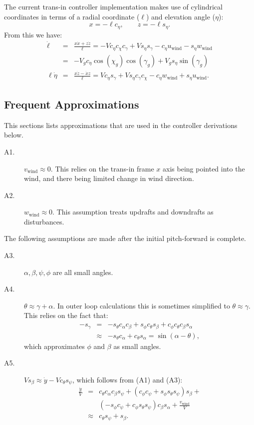 \documentclass{article}
\newcommand{\uwind}{u_{\textrm{wind}}}
\newcommand{\vwind}{v_{\textrm{wind}}}
\newcommand{\wwind}{w_{\textrm{wind}}}
\newcommand{\radius}{\ell}
\newcommand{\dradius}{\dot \radius}
\newcommand{\cchi}{c_\chi}
\newcommand{\cgamma}{c_\gamma}
\newcommand{\ceta}{c_\eta}
\newcommand{\cphi}{c_\phi}
\newcommand{\ctheta}{c_\theta}
\newcommand{\cpsi}{c_\psi}
\newcommand{\calpha}{c_\alpha}
\newcommand{\cbeta}{c_\beta}
\newcommand{\sgamma}{s_\gamma}
\newcommand{\seta}{s_\eta}
\newcommand{\sphi}{s_\phi}
\newcommand{\stheta}{s_\theta}
\newcommand{\spsi}{s_\psi}
\newcommand{\salpha}{s_\alpha}
\newcommand{\sbeta}{s_\beta}
\begin{document}
The current trans-in controller implementation makes use of
cylindrical coordinates in terms of a radial coordinate ($\radius$) and
elevation angle ($\eta$):
\begin{equation}
x = - \radius \ceta, \qquad z = - \radius \seta.
\end{equation}
From this we have:
\begin{eqnarray}
\dradius &=& \frac{x \dot x + z \dot z}\radius =
 -V\ceta\cchi\cgamma + V \seta \sgamma - \ceta \uwind - \seta \wwind \\
&=& -V_g\ceta\cos(\chi_g)\cos(\gamma_g) + V_g \seta \sin(\gamma_g)\\
\radius \dot \eta &=& \frac{ x \dot z - \dot x z}\radius =
V\ceta\sgamma + V \seta\cgamma\cchi
-\ceta\wwind + \seta\uwind.
\end{eqnarray}

\subsection{Frequent Approximations}
This sections lists approximations that are used in the controller
derivations below.
\begin{description}
\item[A1.] $\vwind \approx 0$.  This relies on the trans-in frame $x$
  axis being pointed into the wind, and there being limited change in
  wind direction.
\item[A2.] $\wwind \approx 0$.  This assumption treats updrafts and
  downdrafts as disturbances.
\end{description}
The following assumptions are made after the initial pitch-forward is
complete.
\begin{description}
\item[A3.] $\alpha, \beta, \psi, \phi$ are all small angles.
\item[A4.] $\theta \approx \gamma + \alpha$.  In outer loop
  calculations this is sometimes simplified to $\theta \approx \gamma$.
  This relies on the fact that:
\begin{eqnarray}
-\sgamma &=&
-\stheta\calpha\cbeta + \sphi\ctheta\sbeta + \cphi\ctheta\cbeta\salpha \\
&\approx& -\stheta\calpha + \ctheta\salpha = \sin(\alpha - \theta),
\end{eqnarray}
which approximates $\phi$ and $\beta$ as small angles.
\item[A5.] $V\sbeta \approx \dot y - V\ctheta\spsi$, which follows
  from (A1) and (A3):
\begin{eqnarray}
\frac{\dot y}V &=& \ctheta \calpha \cbeta \spsi +
(\cphi\cpsi + \sphi\stheta\spsi)\sbeta + \\
&& (-\sphi\cpsi + \cphi\stheta\spsi)\cbeta\salpha + \frac{\vwind}V\\
&\approx& \ctheta \spsi + \sbeta.
\end{eqnarray}
\end{description}
\end{document}
